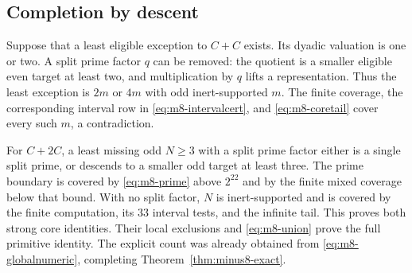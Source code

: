 \subsection{Completion by descent}

Suppose that a least eligible exception to \(C+C\) exists.
Its dyadic valuation is one or two. A split prime factor \(q\)
can be removed: the quotient is a smaller eligible even target
at least two, and multiplication by \(q\) lifts a representation.
Thus the least exception is \(2m\) or \(4m\) with odd
inert-supported \(m\). The finite coverage, the corresponding
interval row in \eqref{eq:m8-intervalcert}, and
\eqref{eq:m8-coretail} cover every such \(m\), a contradiction.

For \(C+2C\), a least missing odd \(N\ge3\) with a split prime
factor either is a single split prime, or descends to a smaller
odd target at least three. The prime boundary is covered by
\eqref{eq:m8-prime} above \(2^{22}\) and by the finite mixed
coverage below that bound. With no split factor, \(N\) is
inert-supported and is covered by the finite computation, its
\(33\) interval tests, and the infinite tail.
This proves both strong core identities. Their local exclusions
and \eqref{eq:m8-union} prove the full primitive identity.
The explicit count was already obtained from
\eqref{eq:m8-globalnumeric}, completing
Theorem~\ref{thm:minus8-exact}.
